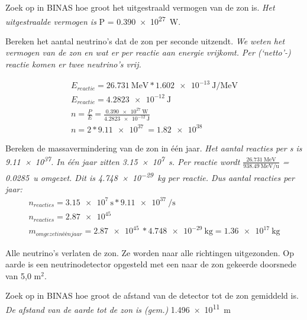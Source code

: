 \begin{opdrachten}
\begin{opdrachten}
    \item Zoek op in BINAS hoe groot het uitgestraald vermogen van de zon is. 
    \textit{Het uitgestraalde vermogen is } P = \SI{0.390e27}{\watt}.
    
    \item Bereken het aantal neutrino's dat de zon per seconde uitzendt.
    \textit{ We weten het vermogen van de zon en wat er per reactie aan energie vrijkomt.
    Per (`netto'-) reactie komen er twee neutrino's vrij.}

    \begin{eqnarray*}
    E_{reactie} = \SI{26.731}{\mega\electronvolt} *\SI{1.602e-13}{\joule \per\mega\electronvolt} \\
    E_{reactie} = \SI{4.2823e-12}{\joule}\\
    n = \frac{P}{E} = \frac{\SI{0.390e27}{\watt}}{\SI{4.2823e-12}{\joule}}\\
    n = 2* \SI{9.11e37}{} = \SI{1.82e38}{}
    \end{eqnarray*}
  
    
    \item Bereken de massavermindering van de zon in één jaar.
    \textit{ Het aantal reacties per s is \SI{9.11e37}{}. In één jaar zitten 
    \SI{3.15e7}{\second}. Per reactie wordt $\frac{\SI{26.731}{\mega\electronvolt}}{\SI{938.49}{\mega\electronvolt\per\atomicmassunit} }$
    = \SI{0.0285}{\atomicmassunit} omgezet. Dit is \SI{4.748e-29}{\kilo\gram} per reactie. 
    Dus aantal reacties per jaar:}
    \begin{eqnarray*}
    n_{reacties} = \SI{3.15e7}{\second}*\SI{9.11e37}{\per\second} \\
    n_{reacties} = \SI{2.87e45}{} \\
    m_{omgezetinéénjaar} = \SI{2.87e45}{} * \SI{4.748e-29}{\kilo\gram} = \SI{1.36e17}{\kilo\gram}
    \end{eqnarray*}
    
    
    Alle neutrino's verlaten de zon. Ze worden naar alle richtingen uitgezonden. 
    Op aarde is een neutrinodetector opgesteld met een naar de zon gekeerde 
    doorsnede van 5,0 m$^{2}$.\\
    \item Zoek op in BINAS hoe groot de afstand van de detector tot de zon gemiddeld 
    is. \\
    \textit{ De afstand van de aarde tot de zon is (gem.)} \SI{1.496e11}{\meter}
    

\end{opdrachten}
\end{opdrachten}
